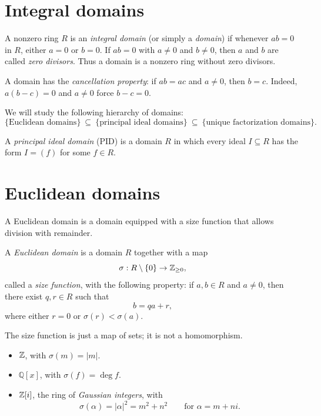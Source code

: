 \documentclass[reqno,11pt]{amsart}
\newcommand{\Q}{\mathbb{Q}}
\begin{document}
\raggedbottom
\makelecturetitle

\section{Integral domains}

\begin{define}
A nonzero ring $R$ is an \emph{integral domain} (or simply a \emph{domain})
if whenever $ab=0$ in $R$, either $a=0$ or $b=0$.
If $ab=0$ with $a\neq0$ and $b\neq0$, then $a$ and $b$ are called
\emph{zero divisors}. Thus a domain is a nonzero ring without zero divisors.
\end{define}

A domain has the \emph{cancellation property}: if $ab=ac$ and
$a\neq0$, then $b=c$. Indeed, $a(b-c)=0$ and $a\neq0$ force
$b-c=0$.

We will study the following hierarchy of domains:
\[
  \{\text{Euclidean domains}\}\ \subseteq\
  \{\text{principal ideal domains}\}\ \subseteq\
  \{\text{unique factorization domains}\}.
\]

\begin{define}
A \emph{principal ideal domain} (PID) is a domain $R$ in which every
ideal $I\subseteq R$ has the form $I=(f)$ for some $f\in R$.
\end{define}

\section{Euclidean domains}

A Euclidean domain is a domain equipped with a size function that
allows division with remainder.

\begin{define}
A \emph{Euclidean domain} is a domain $R$ together with a map
\[
  \sigma:R\setminus\{0\}\to\mathbb{Z}_{\geq0},
\]
called a \emph{size function}, with the following property:
if $a,b\in R$ and $a\neq0$, then there exist $q,r\in R$ such that
\[
  b=qa+r,
\]
where either $r=0$ or $\sigma(r)<\sigma(a)$.
\end{define}

\begin{remark}
The size function is just a map of sets; it is not a homomorphism.
\end{remark}

\begin{example}[Euclidean domains]\leavevmode
\begin{itemize}
  \item $\mathbb{Z}$, with $\sigma(m)=|m|$.
  \item $\Q[x]$, with $\sigma(f)=\deg f$.
  \item $\mathbb{Z}[i]$, the ring of \emph{Gaussian integers}, with
  \[
    \sigma(\alpha)=|\alpha|^2=m^2+n^2\qquad\text{for }\alpha=m+ni.
  \]
\end{itemize}
\end{example}
\end{document}
